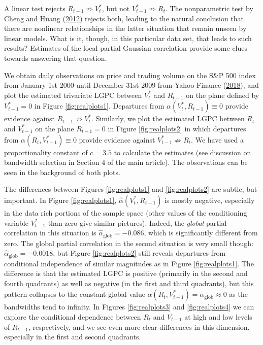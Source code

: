 \documentclass[
  12pt,
  letterpaper]{article}
\numberwithin{equation}{section}
\begin{document}
A linear test rejects \(R_{t-1} \not\Rightarrow V_t^*\), but not \(V_{t-1}^* \not\Rightarrow R_t\). The nonparametric test by Cheng and Huang (\protect\hyperlink{ref-cheng2012conditional}{2012}) rejects both, leading to the natural conclusion that there are nonlinear relationships in the latter situation that remain unseen by linear models. What is it, though, in this particular data set, that leads to such results? Estimates of the local partial Gaussian correlation provide some clues towards answering that question.

We obtain daily observations on price and trading volume on the S\&P 500 index from January 1st 2000 until December 31st 2009 from Yahoo Finance (\protect\hyperlink{ref-yahoo}{2018}), and plot the estimated trivariate LGPC between \(V_t^*\) and \(R_{t-1}\) on the plane defined by \(V_{t-1}^* = 0\) in Figure \ref{fig:realplots1}. Departures from \(\alpha(V_t^*, R_{t-1}) \equiv 0\) provide evidence against \(R_{t-1} \not\Rightarrow V_{t}^*\). Similarly, we plot the estimated LGPC between \(R_t\) and \(V^*_{t-1}\) on the plane \(R_{t-1} = 0\) in Figure \ref{fig:realplots2} in which departures from \(\alpha(R_t, V^*_{t-1}) \equiv 0\) provide evidence against \(V^*_{t-1} \not\Rightarrow R_t\). We have used a proportionality constant of \(c = 3.5\) to calculate the estimates (see discussion on bandwidth selection in Section 4 of the main article). The observations can be seen in the background of both plots.

The differences between Figures \ref{fig:realplots1} and \ref{fig:realplots2} are subtle, but important. In Figure \ref{fig:realplots1}, \(\widehat\alpha(V_t^*, R_{t-1})\) is mostly negative, especially in the data rich portions of the sample space (other values of the conditioning variable \(V_{t-1}^*\) than zero give similar pictures). Indeed, the \emph{global} partial correlation in this situation is \(\widehat{\alpha}_{\textrm{glob}} = -0.086\), which is significantly different from zero. The global partial correlation in the second situation is very small though: \(\widehat{\alpha}_{\textrm{glob}} = -0.0018\), but Figure \ref{fig:realplots2} still reveals departures from conditional independence of similar magnitudes as in Figure \ref{fig:realplots1}. The difference is that the estimated LGPC is positive (primarily in the second and fourth quadrants) as well as negative (in the first and third quadrants), but this pattern collapses to the constant global value \(\alpha(R_t, V_{t-1}^*) = \alpha_{\textrm{glob}} \approx 0\) as the bandwidths tend to infinity. In Figures \ref{fig:realplots3} and \ref{fig:realplots4} we can explore the conditional dependence between \(R_t\) and \(V_{t-1}\) at high and low levels of \(R_{t-1}\), respectively, and we see even more clear differences in this dimension, especially in the first and second quadrants.
\end{document}
